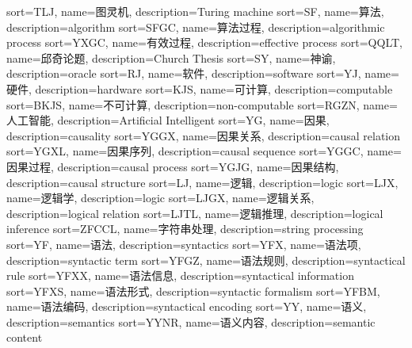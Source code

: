 {
  sort=TLJ,
  name=图灵机,
  description={Turing machine}
}
{
  sort=SF,
  name=算法,
  description={algorithm}
}
{
  sort=SFGC,
  name=算法过程,
  description={algorithmic process}
}
{
  sort=YXGC,
  name=有效过程,
  description={effective process}
}
{
  sort=QQLT,
  name=邱奇论题,
  description={Church Thesis}
}
{
  sort=SY,
  name=神谕,
  description={oracle}
}
{
  sort=RJ,
  name=软件,
  description={software}
}
{
  sort=YJ,
  name=硬件,
  description={hardware}
}
{
  sort=KJS,
  name=可计算,
  description={computable}
}
{
  sort=BKJS,
  name=不可计算,
  description={non-computable}
}
{
  sort=RGZN,
  name=人工智能,
  description={Artificial Intelligent}
}
{
  sort=YG,
  name=因果,
  description={causality}
}
{
  sort=YGGX,
  name=因果关系,
  description={causal relation}
}
{
  sort=YGXL,
  name=因果序列,
  description={causal sequence}
}
{
  sort=YGGC,
  name=因果过程,
  description={causal process}
}
{
  sort=YGJG,
  name=因果结构,
  description={causal structure}
}
{
  sort=LJ,
  name=逻辑,
  description={logic}
}
{
  sort=LJX,
  name=逻辑学,
  description={logic}
}
{
  sort=LJGX,
  name=逻辑关系,
  description={logical relation}
}
{
  sort=LJTL,
  name=逻辑推理,
  description={logical inference}
}
{
  sort=ZFCCL,
  name=字符串处理,
  description={string processing}
}
{
  sort=YF,
  name=语法,
  description={syntactics}
}
{
  sort=YFX,
  name=语法项,
  description={syntactic term}
}
{
  sort=YFGZ,
  name=语法规则,
  description={syntactical rule}
}
{
  sort=YFXX,
  name=语法信息,
  description={syntactical information}
}
{
  sort=YFXS,
  name=语法形式,
  description={syntactic formalism}
}
{
  sort=YFBM,
  name=语法编码,
  description={syntactical encoding}
}
{
  sort=YY,
  name=语义,
  description={semantics}
}
{
  sort=YYNR,
  name=语义内容,
  description={semantic content}
}
